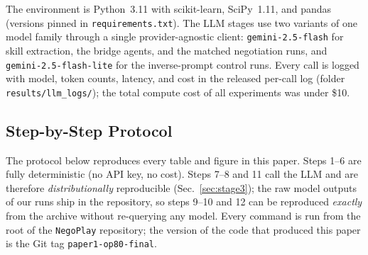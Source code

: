 \documentclass[runningheads]{llncs}
\begin{document}
The environment is Python~3.11 with scikit-learn, SciPy~1.11, and
pandas (versions pinned in \texttt{requirements.txt}). The LLM stages
use two variants of one model family through a single
provider-agnostic client: \texttt{gemini-2.5-flash} for skill
extraction, the bridge agents, and the matched negotiation runs, and
\texttt{gemini-2.5-flash-lite} for the inverse-prompt control runs.
Every call is logged with model, token counts, latency, and cost in
the released per-call log (folder \texttt{results/llm\_logs/}); the
total compute cost of all experiments was under \$10.

\subsection{Step-by-Step Protocol}\label{app:steps}

The protocol below reproduces every table and figure in this paper.
Steps 1--6 are fully deterministic (no API key, no cost). Steps 7--8
and 11 call the LLM and are therefore \emph{distributionally}
reproducible (Sec.~\ref{sec:stage3}); the raw model outputs of our runs
ship in the repository, so steps 9--10 and 12 can be reproduced
\emph{exactly} from the archive without re-querying any model. Every
command is run from the root of the \texttt{NegoPlay} repository; the
version of the code that produced this paper is the Git tag
\texttt{paper1-op80-final}.
\end{document}
